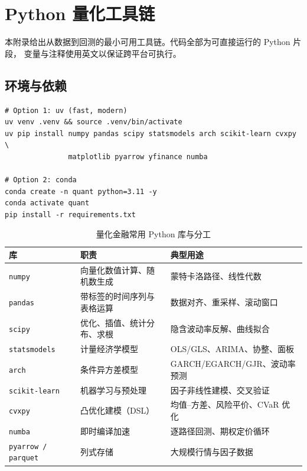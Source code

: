 \chapter{Python 量化工具链}
\label{app:python}

本附录给出从数据到回测的最小可用工具链。代码全部为可直接运行的 Python 片段，
变量与注释使用英文以保证跨平台可执行。

\section{环境与依赖}

\begin{lstlisting}[style=shellstyle,
  caption={推荐的环境准备方式（uv 与 conda 二选一）},
  label={lst:env}]
# Option 1: uv (fast, modern)
uv venv .venv && source .venv/bin/activate
uv pip install numpy pandas scipy statsmodels arch scikit-learn cvxpy \
               matplotlib pyarrow yfinance numba

# Option 2: conda
conda create -n quant python=3.11 -y
conda activate quant
pip install -r requirements.txt
\end{lstlisting}

\begin{table}[htbp]
\centering
\caption{量化金融常用 Python 库与分工}\label{tab:python-libs}
\tablefont
\begin{tabularx}{\textwidth}{@{}L{3.2cm}Y L{4.6cm}@{}}
\toprule
\textbf{库} & \textbf{职责} & \textbf{典型用途} \\
\midrule
\texttt{numpy} & 向量化数值计算、随机数生成 & 蒙特卡洛路径、线性代数 \\
\texttt{pandas} & 带标签的时间序列与表格运算 & 数据对齐、重采样、滚动窗口 \\
\texttt{scipy} & 优化、插值、统计分布、求根 & 隐含波动率反解、曲线拟合 \\
\texttt{statsmodels} & 计量经济学模型 & OLS/GLS、ARIMA、协整、面板 \\
\texttt{arch} & 条件异方差模型 & GARCH/EGARCH/GJR、波动率预测 \\
\texttt{scikit-learn} & 机器学习与预处理 & 因子非线性建模、交叉验证 \\
\texttt{cvxpy} & 凸优化建模（DSL） & 均值--方差、风险平价、CVaR 优化 \\
\texttt{numba} & 即时编译加速 & 逐路径回测、期权定价循环 \\
\texttt{pyarrow / parquet} & 列式存储 & 大规模行情与因子数据 \\
\bottomrule
\end{tabularx}
\end{table}

